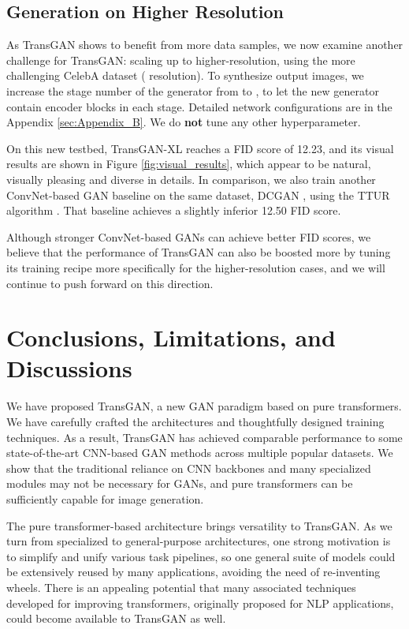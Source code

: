 \documentclass{article}
\begin{document}
\subsection{Generation on Higher Resolution}
As TransGAN shows to benefit from more data samples, we now examine another challenge for TransGAN: scaling up to higher-resolution, using the more challenging CelebA dataset ( resolution). To synthesize  output images, we increase the stage number of the generator from  to , to let the new generator contain  encoder blocks in each stage. Detailed network configurations are in the Appendix \ref{sec:Appendix_B}. We do \textbf{not} tune any other hyperparameter.

On this new testbed, TransGAN-XL reaches a FID score of 12.23, and its visual results are shown in Figure \ref{fig:visual_results}, which appear to be natural, visually pleasing and diverse in details. In comparison, we also train another ConvNet-based GAN baseline on the same dataset, DCGAN \cite{radford2015unsupervised}, using the TTUR algorithm \cite{heusel2017gans}. That baseline achieves a slightly inferior 12.50 FID score. 

Although stronger ConvNet-based GANs can achieve better FID scores, we believe that the performance of TransGAN can also be boosted more by tuning its training recipe more specifically for the higher-resolution cases, and we will continue to push forward on this direction. 















\section{Conclusions, Limitations, and Discussions}

We have proposed TransGAN, a new GAN paradigm based on pure transformers. We have carefully crafted the architectures and thoughtfully designed training techniques. As a result, TransGAN has achieved comparable performance to some state-of-the-art CNN-based GAN methods across multiple popular datasets. We show that the traditional reliance on CNN backbones and many specialized modules may not be necessary for GANs, and pure transformers can be sufficiently capable for image generation. 

The pure transformer-based architecture brings versatility to TransGAN. As we turn from specialized to general-purpose architectures, one strong motivation is to simplify and unify various task pipelines, so one general suite of models could be extensively reused by many applications, avoiding the need of re-inventing wheels. There is an appealing potential that many associated techniques developed for improving transformers, originally proposed for NLP applications, could become available to TransGAN as well. 
\end{document}
